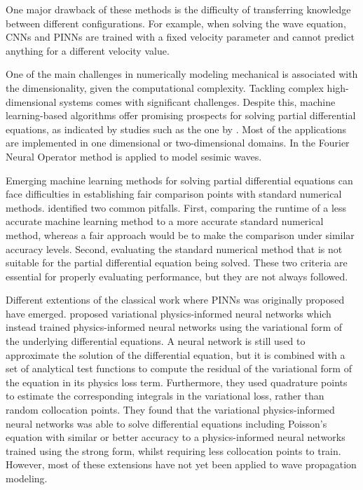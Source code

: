 \documentclass[11pt,twoside]{article}
\begin{document}
One major drawback of these methods is the difficulty of transferring knowledge between different configurations. For example, when solving 
the wave equation, CNNs and PINNs are trained with a fixed velocity parameter and cannot predict anything for a different velocity value. 

One of the main challenges in numerically modeling mechanical is associated with the dimensionality, given the computational complexity. 
Tackling complex high-dimensional systems comes with significant challenges. Despite this, machine learning-based algorithms offer promising 
prospects for solving partial differential equations, as indicated by studies such as the one by . 
Most of the applications are implemented in one dimensional or two-dimensional domains. In  the Fourier 
Neural Operator method is applied to model sesimic waves.

Emerging machine learning methods for solving partial differential equations can face difficulties in establishing fair comparison points 
with standard numerical methods. \citeauthor{mcgreivy_weak_2024} identified two common pitfalls. First, comparing the runtime of a less 
accurate machine learning method to a more accurate standard numerical method, whereas a fair approach would be to make the comparison under 
similar accuracy levels. Second, evaluating the standard numerical method that is not suitable for the partial differential equation being 
solved. These two criteria are essential for properly evaluating performance, but they are not always followed. 
 
Different extentions of the classical work where PINNs was originally proposed have emerged.  
proposed variational physics-informed neural networks which instead trained physics-informed neural networks using the variational form of the 
underlying differential equations. A neural network is still used to approximate the solution of the differential equation, but it is combined 
with a set of analytical test functions to compute the residual of the variational form of the equation in its physics loss term. Furthermore, 
they used quadrature points to estimate the corresponding integrals in the variational loss, rather than random collocation points. They found 
that the variational physics-informed neural networks was able to solve differential equations including Poisson’s equation with similar or 
better accuracy to a physics-informed neural networks trained using the strong form, whilst requiring less collocation points to train. 
However, most of these extensions have not yet been applied to wave propagation modeling.
\end{document}
